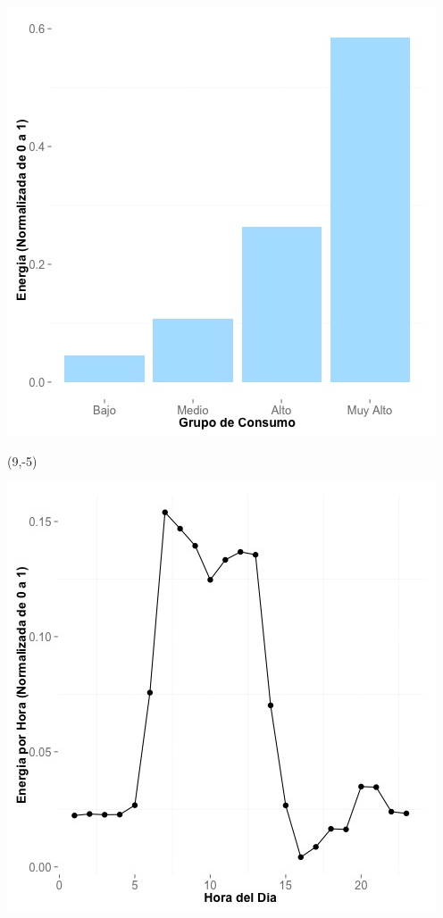 \documentclass{article}\usepackage[]{graphicx}\usepackage[]{color}
\newenvironment{knitrout}{}{} %
\begin{document}
\begin{knitrout}
\color{fgcolor}
\includegraphics[scale=0.65]{figure/A18_neighbor_plot} 
\end{knitrout}

 \begin{textblock}{1}(9,-5)
\begin{minipage}{20em}
\begingroup

\endgroup
\end{minipage}
\end{textblock}


\begin{knitrout}
\color{fgcolor}
\includegraphics[scale=0.65]{figure/A18_plot_norm_median} 
\end{knitrout}
\end{document}
